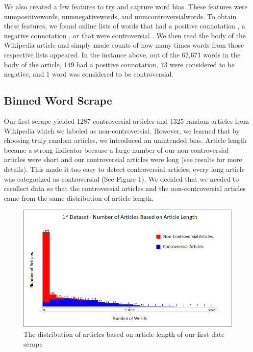 \documentclass{article}
\begin{document}
We also created a few features to try and capture word bias. These features were num\textunderscore positive\textunderscore words, num\textunderscore negative\textunderscore words, and num\textunderscore controversial\textunderscore words. To obtain these features, we found online lists of words that had a positive connotation \cite{positiveWords}, a negative connotation \cite{negativeWords}, or that were controversial \cite{contraWords}. We then read the body of the Wikipedia article and simply made counts of how many times words from those respective lists appeared.
In the instance above, out of the 62,671 words in the body of the article, 149 had a positive connotation, 73 were considered to be negative, and 1 word was considered to be controversial. 

\subsection{Binned Word Scrape}

Our first scrape yielded 1287 controversial articles and 1325 random articles from Wikipedia which we labeled as non-controversial. However, we learned that by choosing truly random articles, we introduced an unintended bias. Article length became a strong indicator because a large number of our non-controversial articles were short and our controversial articles were long (see results for more details). This made it too easy to detect controversial articles: every long article was categorized as controversial (See Figure 1). We decided that we needed to recollect data so that the controversial articles and the non-controversial articles came from the same distribution of article length. 


\begin{figure}[t]
	\centering
	\includegraphics[width=\columnwidth]{images/first-scrape.png}
	\caption{The distribution of articles based on article length of our first date scrape}
	\label{fig:first-scrape}
\end{figure}
\end{document}
